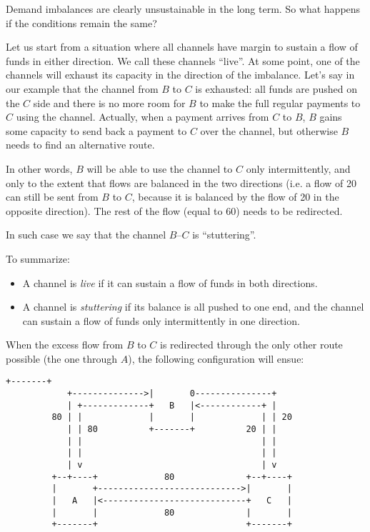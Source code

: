\documentclass[a4paper]{article}
\begin{document}
Demand imbalances are clearly unsustainable in the long term. So what happens if the conditions remain the same?

Let us start from a situation where all channels have margin to sustain a flow of funds in either direction. We call these channels ``live''. At some point, one of the channels will exhaust its capacity in the direction of the imbalance. Let's say in our example that the channel from $B$ to $C$ is exhausted: all funds are pushed on the $C$ side and there is no more room for $B$ to make the full regular payments to $C$ using the channel. Actually, when a payment arrives from $C$ to $B$, $B$ gains some capacity to send back a payment to $C$ over the channel, but otherwise $B$ needs to find an alternative route.

In other words, $B$ will be able to use the channel to $C$ only intermittently, and only to the extent that flows are balanced in the two directions (i.e. a flow of 20 can still be sent from $B$ to $C$, because it is balanced by the flow of 20 in the opposite direction). The rest of the flow (equal to 60) needs to be redirected.

In such case we say that the channel $B$--$C$ is ``stuttering''.

To summarize:
\begin{itemize}
\item A channel is \emph{live} if it can sustain a flow of funds in both directions.
\item A channel is \emph{stuttering} if its balance is all pushed to one end, and the channel can sustain a flow of funds only intermittently in one direction.
\end{itemize}

When the excess flow from $B$ to $C$ is redirected through the only other route possible (the one through $A$), the following configuration will ensue:
\begin{Verbatim}[samepage=true]
                            +-------+
            +-------------->|       0---------------+
            | +-------------+   B   |<------------+ |
         80 | |             |       |             | | 20
            | | 80          +-------+          20 | |
            | |                                   | |
            | |                                   | |
            | v                                   | v
         +--+----+             80              +--+----+
         |       +---------------------------->|       |
         |   A   |<----------------------------+   C   |
         |       |             80              |       |
         +-------+                             +-------+
\end{Verbatim}
\end{document}
